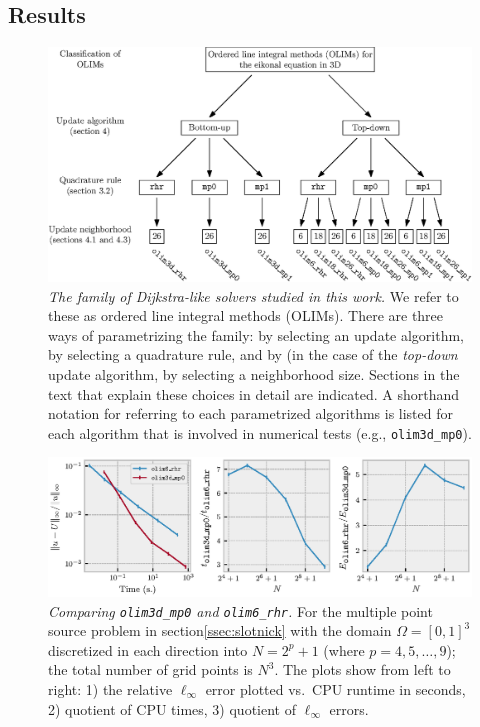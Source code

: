 \documentclass[smallcondensed]{svjour3}
\begin{document}
\subsection{Results}

\begin{figure}
  \centering
  \includegraphics[width=\linewidth]{classification.eps}
  \caption{
    \emph{The family of Dijkstra-like solvers studied in this work.}
    We refer to these as ordered line integral methods (OLIMs).  There
    are three ways of parametrizing the family: by selecting an update
    algorithm, by selecting a quadrature rule, and by (in the case of
    the \emph{top-down} update algorithm, by selecting a neighborhood
    size. Sections in the text that explain these choices in detail
    are indicated. A shorthand notation for referring to each
    parametrized algorithms is listed for each algorithm that is
    involved in numerical tests (e.g., \texttt{olim3d\_mp0}).
  }\label{fig:classification}
\end{figure}

\begin{figure}
  \centering
  \includegraphics[width=\linewidth]{intro.eps}
  \caption{\emph{Comparing \texttt{olim3d\_mp0} and
      \texttt{olim6\_rhr}.} For the multiple point source problem in
    section\@ \ref{ssec:slotnick} with the domain $\Omega = [0, 1]^3$
    discretized in each direction into $N = 2^p + 1$ (where
    $p = 4, 5, \hdots, 9$); the total number of grid points is
    $N^3$. The plots show from left to right: 1) the relative
    $\ell_\infty$ error plotted vs.\ CPU runtime in seconds, 2)
    quotient of CPU times, 3) quotient of $\ell_\infty$
    errors.}\label{fig:intro}
\end{figure}
\end{document}
